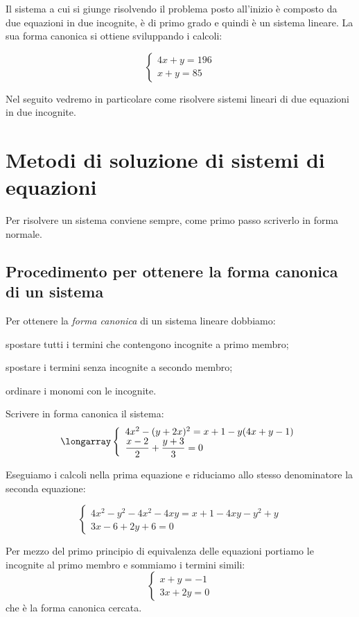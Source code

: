Il sistema a cui si giunge risolvendo il problema posto all'inizio è
composto da due equazioni in due incognite, è di primo grado 
e quindi è un sistema lineare. 
La sua forma canonica si ottiene sviluppando i calcoli:

\[\left\{\begin{array}{l}
4x+y=196\\
x+y=85
\end{array}\right.\]

Nel seguito vedremo in particolare come risolvere sistemi lineari 
di due equazioni in due incognite.

\section{Metodi di soluzione di sistemi di equazioni}
\label{sec:sist_soluzione}

Per risolvere un sistema conviene sempre, come primo passo scriverlo in forma 
normale.

\subsection{Procedimento per ottenere la forma canonica di un sistema}
Per ottenere la \emph{forma canonica} di un sistema lineare dobbiamo:
\begin{enumerate*}
 \item spostare tutti i termini che contengono incognite a primo membro;
 \item spostare i termini senza incognite a secondo membro;
 \item ordinare i monomi con le incognite.
\end{enumerate*}

 \begin{esempio}
 Scrivere in forma canonica il sistema:
\[\longarray\left\{\begin{array}{l}4x^{2}-(y+2x)^{2}=x+1-y(4x+y-1)\\
\dfrac{x-2}{2}+\dfrac{y+3}{3}=0
\end{array}\right.\]

Eseguiamo i calcoli nella prima equazione e riduciamo allo stesso
denominatore la seconda equazione:

\[\left\{\begin{array}{l}
 4x^{2}-y^{2}-4x^{2}-4xy=x+1-4xy-y^{2}+y\\
 3x-6+2y+6=0
 \end{array}\right.\]

Per mezzo del primo principio di equivalenza delle equazioni portiamo le
incognite al primo membro e sommiamo i termini simili:
 \[\left\{\begin{array}{l}
   x+y=-1\\
   3x+2y=0
\end{array}\right.\]
che è la forma canonica cercata.
 \end{esempio}


